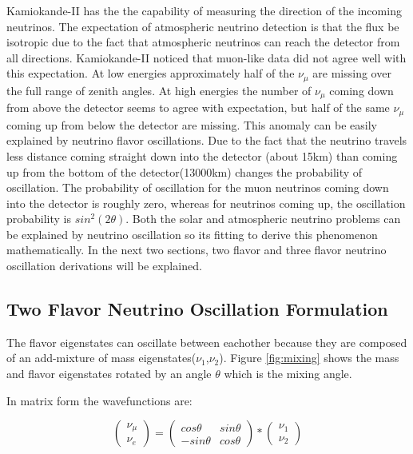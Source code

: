 Kamiokande-II has the the capability of measuring the direction of the incoming neutrinos. The expectation of atmospheric neutrino detection is that the flux be isotropic due to the fact that atmospheric neutrinos can reach the detector from all directions. Kamiokande-II noticed that muon-like data did not agree well with this expectation. At low energies approximately half of the $\nu_{\mu}$ are missing over the full range of zenith angles. At high energies the number of $\nu_{\mu}$ coming down from above the detector seems to agree with expectation, but half of the same $\nu_{\mu}$ coming up from below the detector are missing. This anomaly can be easily explained by neutrino flavor oscillations. Due to the fact that the neutrino travels less distance coming straight down into the detector (about 15km) than coming up from the bottom of the detector(13000km) changes the probability of oscillation. The probability of oscillation for the muon neutrinos coming down into the detector is roughly zero, whereas for neutrinos coming up, the oscillation probability is $sin^2(2\theta)$. Both the solar and atmospheric neutrino problems can be explained by neutrino oscillation so its fitting to derive this phenomenon mathematically. In the next two sections, two flavor and three flavor neutrino oscillation derivations will be explained. 


\subsection{Two Flavor Neutrino Oscillation Formulation}
The flavor eigenstates can oscillate between eachother because they are composed of an add-mixture of mass eigenstates($\nu_{1}$,$\nu_{2}$). Figure \ref{fig:mixing} shows the mass and flavor eigenstates rotated by an angle $\theta$ which is the mixing angle. 

In matrix form the wavefunctions are:

\begin{equation}
\begin{pmatrix}
\nu_{\mu} \\
\nu_{e}
\end{pmatrix} 
 = \begin{pmatrix}
cos\theta & sin\theta \\
-sin\theta & cos\theta 
\end{pmatrix}*
\begin{pmatrix}
\nu_{1} \\
\nu_{2} 
\end{pmatrix}
\end{equation}


